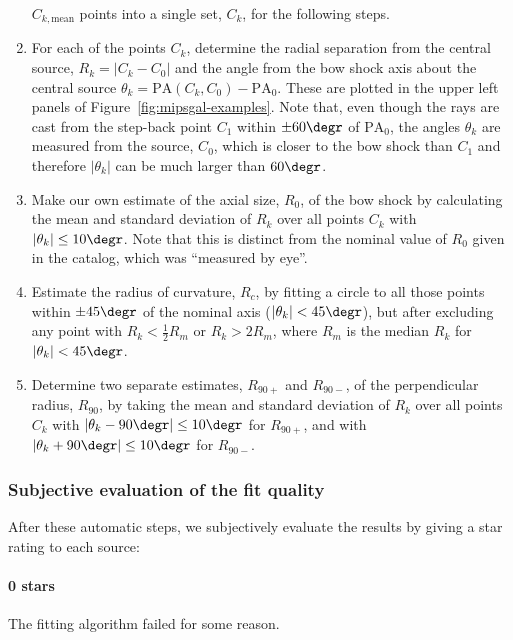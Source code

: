 \begin{enumerate}[1.]
  \(C_{k,\text{mean}}\) points into a single set, \(C_{k}\), for
  the following steps.
\item For each of the points \(C_{k}\), determine the radial
  separation from the central source, \(R_k = |C_k - C_0|\) and the
  angle from the bow shock axis about the central source
  \(\theta_k = \text{PA}(C_k, C_0) - \text{PA}_0\).  These are plotted in
  the upper left panels of Figure~\ref{fig:mipsgal-examples}.  Note
  that, even though the rays are cast from the step-back point \(C_1\)
  within \(\pm 60\degr\) of \(\text{PA}_0\), the angles \(\theta_k\) are
  measured from the source, \(C_0\), which is closer to the bow shock
  than \(C_1\) and therefore \(|\theta_k|\) can be much larger than
  \(60\degr\).
\item Make our own estimate of the axial size, \(R_0\), of the bow
  shock by calculating the mean and standard deviation of \(R_k\) over
  all points \(C_k\) with \(|\theta_k| \le 10\degr\).  Note that this is
  distinct from the nominal value of \(R_0\) given in the
  \citet{Kobulnicky:2016a} catalog, which was ``measured by eye''.
\item Estimate the radius of curvature, \(R_c\), by fitting a circle
  to all those points within \(\pm 45\degr\) of the nominal axis
  (\(|\theta_k| < 45\degr\)), but after excluding any point with
  \(R_k < \frac12 R_m\) or \(R_k > 2 R_m\), where \(R_m\) is the median
  \(R_k\) for \(|\theta_k| < 45\degr\).
\item Determine two separate estimates, \(R_{90+}\) and \(R_{90-}\),
  of the perpendicular radius, \(R_{90}\), by taking the mean and
  standard deviation of \(R_k\) over all points \(C_k\) with
  \(|\theta_k - 90\degr| \le 10\degr\) for \(R_{90+}\), and with
  \(|\theta_k + 90\degr| \le 10\degr\) for \(R_{90-}\).
\end{enumerate}


\subsubsection{Subjective evaluation of the fit quality}
\label{sec:subj-eval-fit}


After these automatic steps, we subjectively evaluate the results by giving a star rating to each source:

\paragraph*{0 stars} The fitting algorithm failed for some reason. 

